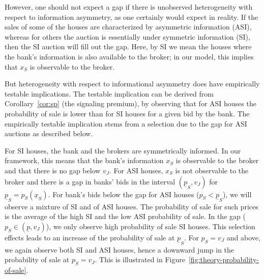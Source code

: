 \documentclass[11pt,twopage]{article}
\newcommand{\ul}{\underline}
\begin{document}
However, one should not expect a gap if there is unobserved
heterogeneity with respect to information asymmetry, as one certainly
would expect in reality. If the sales of some of the houses are
characterized by asymmetric information (ASI), whereas for others the
auction is essentially under symmetric information (SI), then the SI
auction will fill out the gap. Here, by SI we mean the houses where
the bank's information is also available to the broker; in our model,
this implies that $x_S$ is observable to the broker.



But heterogeneity with respect to informational asymmetry does have
empirically testable implications.
The testable implication can be derived from Corollary~\ref{cor:sp}
(the signaling premium), by observing that for ASI houses the
probability of sale is lower than for SI houses for a given bid by the
bank. The empirically testable implication stems from a selection due
to the gap for ASI auctions as described below.

For SI houses, the bank and the brokers are symmetrically informed. In
our framework, this means that the bank's information $x_S$ is
observable to the broker and that there is no gap below $v_J$. For ASI
houses, $x_S$ is not observable to the broker and there is a gap in
banks' bids in the interval $(\ul p_S,v_J)$ for $\ul p_S=p_S(\ul
x_S)$. For bank's bids below the gap for ASI houses ($p_S<\ul p_S$),
we will observe a mixture of SI and of ASI houses. The probability of
sale for such prices is the average of the high SI and the low ASI
probability of sale. In the gap ($p_S\in(\ul p,v_J)$), we only observe
high probability of sale SI houses. This selection effects leads to an
increase of the probability of sale at $\ul p_S$. For $p_S=v_J$ and
above, we again observe both SI and ASI houses, hence a downward jump
in the probability of sale at $p_S=v_J$.
%
This is illustrated in Figure~\ref{fig:theory-probability-of-sale}.
\end{document}
